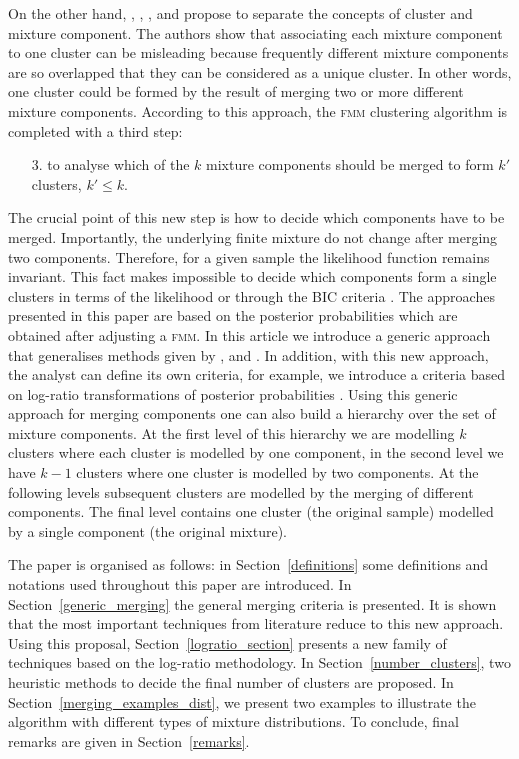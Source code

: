 \documentclass[submit]{smj}
\theoremstyle{definition}
\newcommand{\fmm}{\textsc{fmm}\xspace}
\begin{document}
On the other hand, \cite{lee2004combining}, \cite{hennig2010methods}, \cite{baudry2010combining}, \cite{melnykov2013distribution} and \cite{pastore2013merging} propose to separate the concepts of cluster and mixture component. The authors show that associating each mixture component to one cluster can be misleading because frequently different mixture components are so overlapped that they can be considered as a unique cluster. In other words, one cluster could be formed by the result of merging two or more different mixture components. According to this approach, the \fmm clustering algorithm is completed with a third step:

\begin{itemize}
\item[3.] to analyse which of the $k$ mixture components should be merged to form $k'$ clusters, $k' \leq k$.
\end{itemize}

The crucial point of this new step is how to decide which components have to be merged. Importantly, the underlying finite mixture do not change after merging two components. Therefore, for a given sample the likelihood function remains invariant. This fact makes impossible to decide which components form a single clusters in terms of the likelihood or through the BIC criteria \citep{hennig2010methods}. The approaches presented in this paper are based on the posterior probabilities which are obtained after adjusting a \fmm. In this article we introduce a generic approach that generalises methods given by \cite{baudry2010combining}, \cite{hennig2010methods} and \cite{longford2014}. In addition, with this new approach, the analyst can define its own criteria, for example, we introduce a criteria based on log-ratio transformations of posterior probabilities \citep{aitchison1986statistical}. 
Using this generic approach for merging components one can also build a hierarchy over the set of mixture components. At the first level of this hierarchy we are modelling $k$ clusters where each cluster is modelled by one component, in the second level we have $k-1$ clusters where one cluster is modelled by two components. At the following levels subsequent clusters are modelled by the merging of different components. The final level contains one cluster (the original sample) modelled by a single component (the original mixture).

The paper is organised as follows: in Section~\ref{definitions} some definitions and notations used throughout this paper are introduced. In Section~\ref{generic_merging} the general merging criteria is presented. It is shown that the most important techniques from literature reduce to this new approach. Using this proposal, Section~\ref{logratio_section} presents a new family of techniques based on the log-ratio methodology. In Section~\ref{number_clusters}, two heuristic methods to decide the final number of clusters are proposed. In Section~\ref{merging_examples_dist}, we present two examples to illustrate the algorithm with different types of mixture distributions. To conclude, final remarks are given in Section~\ref{remarks}.
\end{document}
